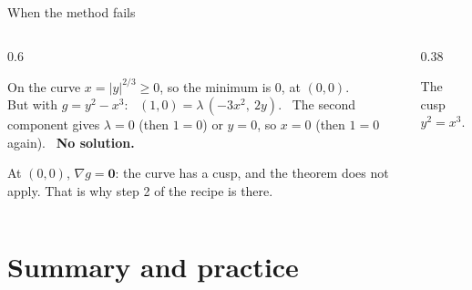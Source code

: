 \documentclass[10pt]{wosm-slides}
\begin{document}
\begin{frame}{When the method fails}
  \begin{columns}[c]
    \begin{column}{0.6\textwidth}
      \begin{example}[Minimise $f = x$ on the curve $y^2 = x^3$]
        On the curve $x = |y|^{2/3} \ge 0$, so the minimum is $0$, at $(0, 0)$.
        \pause\\[0.3em]
        But with $g = y^2 - x^3$: \ $(1, 0) = \lambda\,(-3x^2, \ 2y)$. \ The second component gives
        $\lambda = 0$ (then $1 = 0$) or $y = 0$, so $x = 0$ (then $1 = 0$ again). \
        \textbf{No solution.}
      \end{example}
      \pause
      At $(0, 0)$, $\nabla g = \mathbf 0$: the curve has a cusp, and the theorem does not apply.
      That is why step 2 of the recipe is there.
    \end{column}
    \begin{column}{0.38\textwidth}
      \centering
      \par\small The cusp $y^2 = x^3$.
    \end{column}
  \end{columns}
\end{frame}

\section{Summary and practice}
\end{document}
